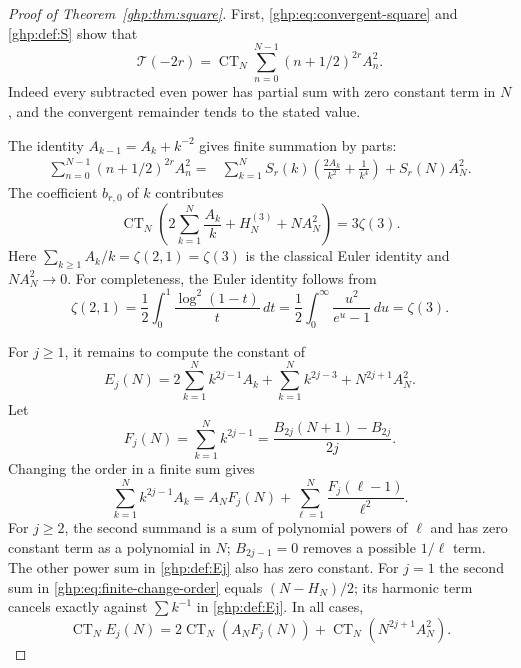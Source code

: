 \begin{proof}[Proof of Theorem~\ref{ghp:thm:square}]
First, \eqref{ghp:eq:convergent-square} and \eqref{ghp:def:S} show that
\begin{equation}\label{ghp:eq:ct-reduction}
 \mathcal T(-2r)=\operatorname{CT}_N
       \sum_{n=0}^{N-1}(n+1/2)^{2r}A_n^2.
\end{equation}
Indeed every subtracted even power has partial sum with zero constant
term in $N$, and the convergent remainder tends to the stated value.

The identity $A_{k-1}=A_k+k^{-2}$ gives finite summation by parts:
\begin{align}\label{ghp:eq:partial-sum}
 \sum_{n=0}^{N-1}(n+1/2)^{2r}A_n^2
 ={}&\sum_{k=1}^N S_r(k)
          \left(\frac{2A_k}{k^2}+\frac1{k^4}\right)
       +S_r(N)A_N^2.
\end{align}
The coefficient $b_{r,0}$ of $k$ contributes
\[
 \operatorname{CT}_N
 \left(2\sum_{k=1}^N\frac{A_k}{k}+H_N^{(3)}+NA_N^2\right)
 =3\zeta(3).
\]
Here $\sum_{k\geq1}A_k/k=\zeta(2,1)=\zeta(3)$ is the classical
Euler identity and $NA_N^2\to0$. For completeness, the Euler identity
follows from
\[
 \zeta(2,1)=\frac12\int_0^1\frac{\log^2(1-t)}t\,dt
 =\frac12\int_0^\infty\frac{u^2}{e^u-1}\,du=\zeta(3).
\]

For $j\geq1$, it remains to compute the constant of
\begin{equation}\label{ghp:def:Ej}
 E_j(N)=2\sum_{k=1}^Nk^{2j-1}A_k
        +\sum_{k=1}^Nk^{2j-3}+N^{2j+1}A_N^2.
\end{equation}
Let
\[
 F_j(N)=\sum_{k=1}^Nk^{2j-1}
       =\frac{B_{2j}(N+1)-B_{2j}}{2j}.
\]
Changing the order in a finite sum gives
\begin{equation}\label{ghp:eq:finite-change-order}
 \sum_{k=1}^Nk^{2j-1}A_k
  =A_NF_j(N)+\sum_{\ell=1}^N\frac{F_j(\ell-1)}{\ell^2}.
\end{equation}
For $j\geq2$, the second summand is a sum of polynomial powers of
$\ell$ and has zero constant term as a polynomial in $N$;
$B_{2j-1}=0$ removes a possible $1/\ell$ term. The other power sum in
\eqref{ghp:def:Ej} also has zero constant. For $j=1$ the second sum in
\eqref{ghp:eq:finite-change-order} equals $(N-H_N)/2$; its harmonic
term cancels exactly against $\sum k^{-1}$ in \eqref{ghp:def:Ej}.
In all cases,
\begin{equation}\label{ghp:eq:Ej-CT}
 \operatorname{CT}_NE_j(N)
   =2\operatorname{CT}_N(A_NF_j(N))
          +\operatorname{CT}_N(N^{2j+1}A_N^2).
\end{equation}


\end{proof}
